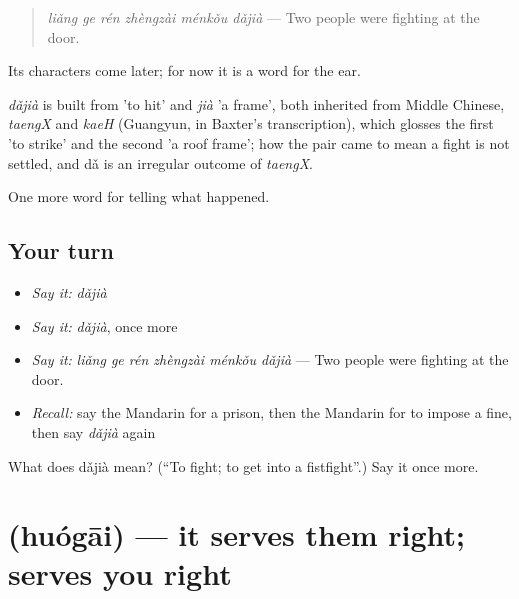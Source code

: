 \begin{quote}
\emph{liǎng ge rén zhèngzài ménkǒu dǎjià} — Two people were fighting at the door.
\end{quote}

Its characters come later; for now it is a word for the ear.

\begin{cousinweb}
\emph{dǎjià} is built from  'to hit' and \emph{jià} 'a frame', both inherited from Middle Chinese, \emph{taengX} and \emph{kaeH} (Guangyun, in Baxter's transcription), which glosses the first 'to strike' and the second 'a roof frame'; how the pair came to mean a fight is not settled, and dǎ is an irregular outcome of \emph{taengX}.
\end{cousinweb}

\begin{grammarlens}[title={What you've built}]
One more word for telling what happened.
\end{grammarlens}

\subsection*{Your turn}
\begin{itemize}
\raggedright
  \item \emph{Say it:} \emph{dǎjià}
  \item \emph{Say it:} \emph{dǎjià}, once more
  \item \emph{Say it:} \emph{liǎng ge rén zhèngzài ménkǒu dǎjià} — Two people were fighting at the door.
  \item \emph{Recall:} say the Mandarin for a prison, then the Mandarin for to impose a fine, then say \emph{dǎjià} again
\end{itemize}

\begin{tcolorbox}[breakable,colback=teal!4,colframe=teal!35!black,title={Before you move on}]
What does dǎjià mean? (\textquotedblleft{}To fight; to get into a fistfight\textquotedblright{}.) Say it once more.
\end{tcolorbox}
\section[\texorpdfstring{\zh{活该} (huógāi)}{活该 (huógāi)}]{ (huógāi) — it serves them right; serves you right}

\label{lesson:ZH-C312-huogai}



